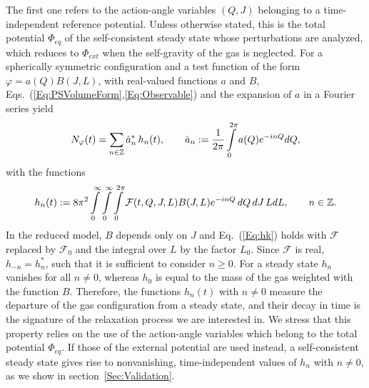 The first one refers to the action-angle variables $(Q,J)$ belonging to a time-independent reference potential. Unless otherwise stated, this is the total potential $\Phi_{eq}$ of the self-consistent steady state whose perturbations are analyzed, which reduces to $\Phi_{ext}$ when the self-gravity of the gas is neglected. For a spherically symmetric configuration and a test function of the form $\varphi = a(Q) B(J,L)$, with real-valued functions $a$ and $B$, Eqs.~(\ref{Eq:PSVolumeForm},\ref{Eq:Observable}) and the expansion of $a$ in a Fourier series yield
\begin{equation}
N_\varphi(t) = \sum\limits_{n\in\mathbb{Z}} \hat{a}_n^*\, h_n(t),\qquad
\hat{a}_n := \frac{1}{2\pi}\int\limits_0^{2\pi} a(Q) e^{-inQ} dQ,
\label{Eq:NphiSum}
\end{equation}
with the functions
\begin{equation}
h_n(t) := 8\pi^2\int\limits_0^\infty\int\limits_0^\infty\int\limits_0^{2\pi} \mathcal{F}(t,Q,J,L) B(J,L) e^{-inQ}\, dQ\, dJ\, L dL,\qquad n\in\mathbb{Z}.
\label{Eq:hk}
\end{equation}
In the reduced model, $B$ depends only on $J$ and Eq.~(\ref{Eq:hk}) holds with $\mathcal{F}$ replaced by $\mathcal{F}_0$ and the integral over $L$ by the factor $L_0$. Since $\mathcal{F}$ is real, $h_{-n} = h_n^*$, such that it is sufficient to consider $n\geq 0$. For a steady state $h_n$ vanishes for all $n\neq 0$, whereas $h_0$ is equal to the mass of the gas weighted with the function $B$. Therefore, the functions $h_n(t)$ with $n\neq 0$ measure the departure of the gas configuration from a steady state, and their decay in time is the signature of the relaxation process we are interested in. We stress that this property relies on the use of the action-angle variables which belong to the total potential $\Phi_{eq}$. If those of the external potential are used instead, a self-consistent steady state gives rise to nonvanishing, time-independent values of $h_n$ with $n\neq 0$, as we show in section~\ref{Sec:Validation}.

